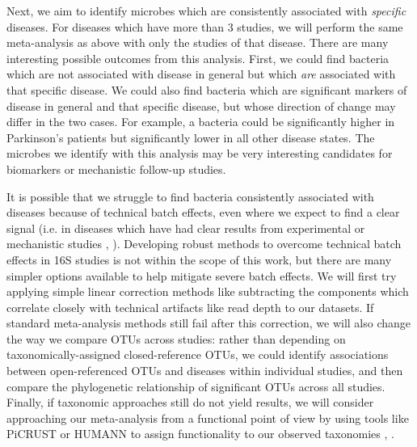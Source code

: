 \documentclass[12pt]{article}
\begin{document}
Next, we aim to identify microbes which are consistently associated with \textit{specific}
diseases. For diseases which have more than 3 studies, we will
perform the same meta-analysis as above with only the studies
of that disease. There are many interesting possible outcomes from this analysis.
First, we could find bacteria which are not associated with disease in general 
but which \textit{are} associated with that specific disease. 
We could also find bacteria which are significant markers of disease in general and 
that specific disease, but whose direction of change may differ in the two cases.
For example, a bacteria could be significantly higher in Parkinson's patients but
significantly lower in all other disease states. The microbes we identify with this
analysis may be very interesting candidates for biomarkers or mechanistic follow-up studies.

It is possible that we struggle to find bacteria consistently 
associated with diseases because of technical batch effects, even 
where we expect to find a clear signal (i.e. in diseases which have 
had clear results from experimental or mechanistic studies \cite{turnbaugh-energy_harvest-2006}, \cite{crc_zeller}). 
Developing robust methods to overcome technical batch effects in 16S 
studies is not within the scope of this work, but there are many
simpler options available to help mitigate severe batch effects. 
We will first try applying simple linear correction methods 
like subtracting the components which correlate closely with technical 
artifacts like read depth to our datasets. 
If standard meta-analysis methods still fail after this correction, we will also 
change the way we compare OTUs across studies:
rather than depending on taxonomically-assigned closed-reference OTUs, 
we could identify associations between open-referenced OTUs and 
diseases within individual studies, and then compare 
the phylogenetic relationship of significant OTUs across all studies. Finally, 
if taxonomic approaches still do not yield results, we will consider
approaching our meta-analysis from a functional point of view by
using tools like PiCRUST or HUMANN to assign functionality to our
observed taxonomies \cite{langille-picrust-2013}, \cite{abubucker-humann-2012}.
\end{document}
